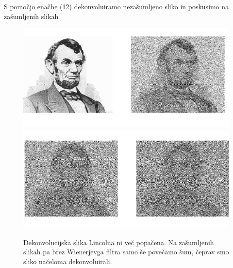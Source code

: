 \documentclass[11pt, a4paper]{article}
\begin{document}
S pomočjo enačbe (12) dekonvoluiramo nezašumljeno sliko in poskusimo na zašumljenih slikah 
\begin{figure}[H]
\centering
\includegraphics[width=16cm, ]{tretja_drugi.png}
\includegraphics[width=16cm, ]{tretja_drugi2.png}
\caption{Dekonvolucijska slika Lincolna ni več popačena. Na zašumljenih slikah pa brez Wienerjevga filtra samo še povečamo šum, čeprav smo sliko načeloma dekonvoluirali.}  
\end{figure}
\end{document}
